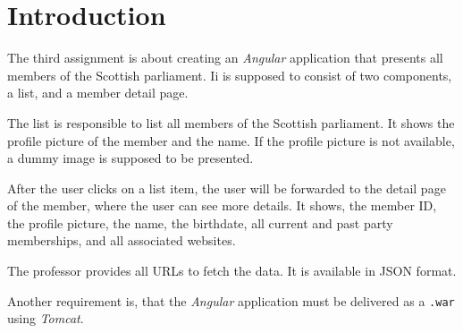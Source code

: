 \section{Introduction}\label{sec:01_intro}
The third assignment is about creating an \textit{Angular} application that presents all members of the Scottish parliament.
Ii is supposed to consist of two components, a list, and a member detail page.

The list is responsible to list all members of the Scottish parliament. It shows the profile picture of the member and the name. If the profile picture is not available, a dummy image is supposed to be presented.

After the user clicks on a list item, the user will be forwarded to the detail page of the member, where the user can see more details. It shows, the member ID, the profile picture, the name, the birthdate, all current and past party memberships, and all associated websites.

The professor provides all URLs to fetch the data. It is available in JSON format.


Another requirement is, that the \textit{Angular} application must be delivered as a \texttt{.war} using \textit{Tomcat}.
